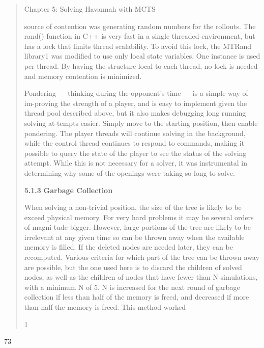 \documentclass[
]{article}
\begin{document}
\begin{quote}
Chapter 5: Solving Havannah with MCTS

source of contention was generating random numbers for the rollouts. The
rand() function in C++ is very fast in a single threaded environment,
but has a lock that limits thread scalability. To avoid this lock, the
MTRand library1 was modified to use only local state variables. One
instance is used per thread. By having the structure local to each
thread, no lock is needed and memory contention is minimized.

Pondering --- thinking during the opponent's time --- is a simple way of
im-proving the strength of a player, and is easy to implement given the
thread pool described above, but it also makes debugging long running
solving at-tempts easier. Simply move to the starting position, then
enable pondering. The player threads will continue solving in the
background, while the control thread continues to respond to commands,
making it possible to query the state of the player to see the status of
the solving attempt. While this is not necessary for a solver, it was
instrumental in determining why some of the openings were taking so long
to solve.

\textbf{5.1.3} \textbf{Garbage Collection}

When solving a non-trivial position, the size of the tree is likely to
be exceed physical memory. For very hard problems it may be several
orders of magni-tude bigger. However, large portions of the tree are
likely to be irrelevant at any given time so can be thrown away when the
available memory is filled. If the deleted nodes are needed later, they
can be recomputed. Various criteria for which part of the tree can be
thrown away are possible, but the one used here is to discard the
children of solved nodes, as well as the children of nodes that have
fewer than N simulations, with a minimum N of 5. N is increased for the
next round of garbage collection if less than half of the memory is
freed, and decreased if more than half the memory is freed. This method
worked

1
\end{quote}

73
\end{document}
